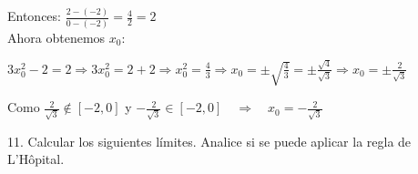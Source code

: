 \documentclass[12pt]{article}
\begin{document}
\begin{enumerate}[\hspace{9px} a)]
        Entonces: \quad \(\displaystyle\frac{2-(-2)}{0-(-2)}=\frac{4}{2}=2\)\\

        Ahora obtenemos $x_0$:

         \qquad \(3x_0^2-2=2 \Rightarrow 3x_0^2=2+2 \Rightarrow x_0^2=\displaystyle\frac{4}{3} \Rightarrow x_0=\pm\sqrt{\frac{4}{3}}=\pm\frac{\sqrt{4}}{\sqrt{3}} \Rightarrow x_0=\pm\frac{2}{\sqrt{3}}\)

          Como \(\displaystyle\frac{2}{\sqrt{3}} \notin [-2,0]\)  y  \(-\displaystyle\frac{2}{\sqrt{3}} \in [-2,0] \quad \Longrightarrow \quad x_0=-\displaystyle\frac{2}{\sqrt{3}}\)\\

\end{enumerate}

11. Calcular los siguientes l\'imites. Analice si se puede aplicar la regla de L'H\^opital.
\end{document}
